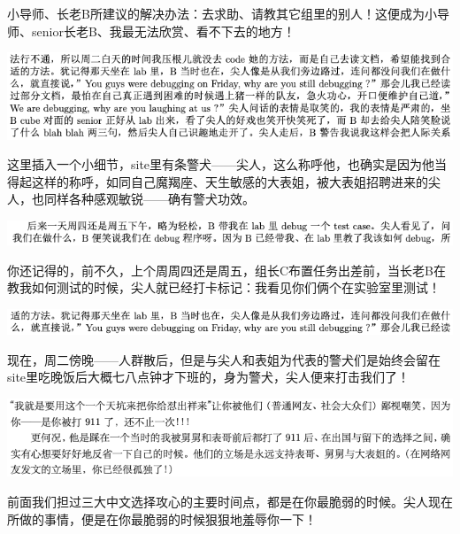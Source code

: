 \documentclass[9pt, b5paper]{article}
\begin{document}
小导师、长老B所建议的解决办法：去求助、请教其它组里的别人！这便成为小导师、senior长老B、我最无法欣赏、看不下去的地方！

\begin{center}
\includegraphics[width=.9\linewidth]{./pic/backups_plans_20210507_125212.png}
\end{center}

这里插入一个小细节，site里有条警犬——尖人，这么称呼他，也确实是因为他当得起这样的称呼，如同自己魔羯座、天生敏感的大表姐，被大表姐招聘进来的尖人，也同样各种感观敏锐——确有警犬功效。

\begin{center}
\includegraphics[width=.9\linewidth]{./pic/backups_plans_20210507_131720.png}
\end{center}

你还记得的，前不久，上个周周四还是周五，组长C布置任务出差前，当长老B在教我如何测试的时候，尖人就已经打卡标记：我看见你们俩个在实验室里测试！

\begin{center}
\includegraphics[width=.9\linewidth]{./pic/backups_plans_20210507_131921.png}
\end{center}

现在，周二傍晚——人群散后，但是与尖人和表姐为代表的警犬们是始终会留在site里吃晚饭后大概七八点钟才下班的，身为警犬，尖人便来打击我们了！

\begin{center}
\includegraphics[width=.9\linewidth]{./pic/backups_plans_20210507_132218.png}
\end{center}

前面我们担过三大中文选择攻心的主要时间点，都是在你最脆弱的时候。尖人现在所做的事情，便是在你最脆弱的时候狠狠地羞辱你一下！
\end{document}
